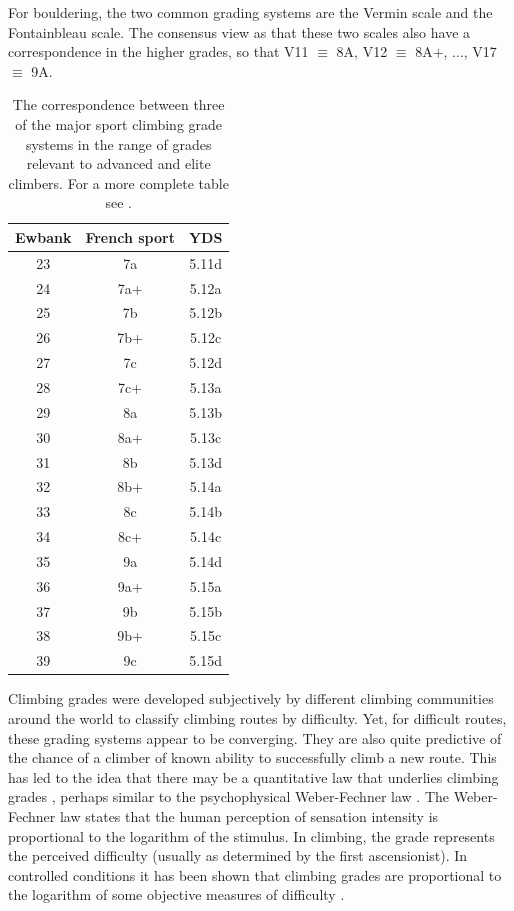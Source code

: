 \documentclass[12pt]{article}
\begin{document}
For bouldering, the two common grading systems are the Vermin scale and the Fontainbleau scale. The consensus view as that these two scales also have a correspondence in the higher grades, so that V11 $\equiv$ 8A, V12 $\equiv$ 8A+, $\dots$, V17 $\equiv$ 9A.


\begin{table}
\centering
\begin{tabular}{| c | c | c |}
  \hline
  {\bf Ewbank} & {\bf French sport} & {\bf YDS} \\
  \hline
  23 & 7a & 5.11d \\
  24 & 7a+ & 5.12a \\
  25 & 7b & 5.12b \\
  26 & 7b+ & 5.12c \\
  27 & 7c & 5.12d \\
  28 & 7c+ & 5.13a \\
  29 & 8a & 5.13b \\
  30 & 8a+ & 5.13c \\
  31 & 8b & 5.13d \\
  32 & 8b+ & 5.14a \\
  33 & 8c & 5.14b \\
  34 & 8c+ & 5.14c \\
  35 & 9a & 5.14d \\
  36 & 9a+ & 5.15a \\
  37 & 9b & 5.15b \\
  38 & 9b+ & 5.15c \\
  39 & 9c & 5.15d \\
  \hline
\end{tabular}
\caption{The correspondence between three of the major sport climbing grade systems in the range of grades relevant to advanced and elite climbers. For a more complete table see \citet{draper2015comparative}. }
\label{table1}
\end{table}

Climbing grades were developed subjectively by different climbing communities around the world to classify climbing routes by difficulty. Yet, for difficult routes, these grading systems appear to be converging. They are also quite predictive of the chance of a climber of known ability to successfully climb a new route.  This has led to the idea that there may be a quantitative law that underlies climbing grades \citep{delignieres1993psychophysical}, perhaps similar to the psychophysical Weber-Fechner law \citep{1834pulsu,fechner1860}. The Weber-Fechner law states that the human perception of sensation intensity is proportional to the logarithm of the stimulus.  In climbing, the grade represents the perceived difficulty (usually as determined by the first ascensionist). In controlled conditions it has been shown that climbing grades are proportional to the logarithm of some objective measures of difficulty \citep{delignieres1993psychophysical}.
\end{document}
